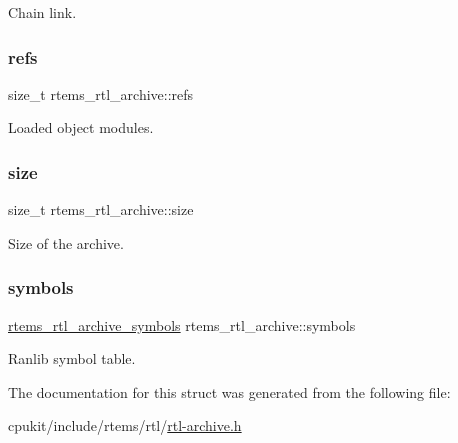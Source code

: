 Chain link. \mbox{\label{structrtems__rtl__archive_a84159a50b185bd0a06154e1a0a1cd83a}} 
\subsubsection{\texorpdfstring{refs}{refs}}
{\footnotesize\ttfamily size\+\_\+t rtems\+\_\+rtl\+\_\+archive\+::refs}

Loaded object modules. \mbox{\label{structrtems__rtl__archive_a891e810ec73a179888d2daf9b74f2c25}} 
\subsubsection{\texorpdfstring{size}{size}}
{\footnotesize\ttfamily size\+\_\+t rtems\+\_\+rtl\+\_\+archive\+::size}

Size of the archive. \mbox{\label{structrtems__rtl__archive_a68ca1d76c92d0abb213ed252f8bf8c7e}} 
\subsubsection{\texorpdfstring{symbols}{symbols}}
{\footnotesize\ttfamily \mbox{\hyperlink{structrtems__rtl__archive__symbols}{rtems\+\_\+rtl\+\_\+archive\+\_\+symbols}} rtems\+\_\+rtl\+\_\+archive\+::symbols}

Ranlib symbol table. 

The documentation for this struct was generated from the following file\+:\begin{DoxyCompactItemize}
\item 
cpukit/include/rtems/rtl/\mbox{\hyperlink{rtl-archive_8h}{rtl-\/archive.\+h}}\end{DoxyCompactItemize}
